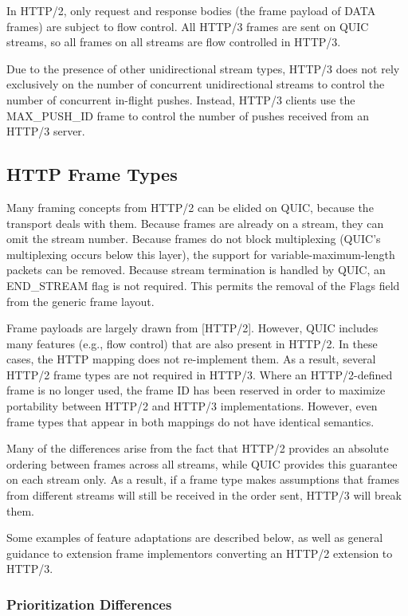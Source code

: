 \documentclass{article}
\begin{document}
In HTTP/2, only request and response bodies (the frame payload of DATA frames) are subject to flow control.  All HTTP/3 frames are sent on QUIC streams, so all frames on all streams are flow controlled in HTTP/3.

Due to the presence of other unidirectional stream types, HTTP/3 does not rely exclusively on the number of concurrent unidirectional streams to control the number of concurrent in-flight pushes. Instead, HTTP/3 clients use the MAX\_PUSH\_ID frame to control the number of pushes received from an HTTP/3 server.

\subsection{HTTP Frame Types}

Many framing concepts from HTTP/2 can be elided on QUIC, because the transport deals with them.  Because frames are already on a stream, they can omit the stream number.  Because frames do not block multiplexing (QUIC's multiplexing occurs below this layer), the support for variable-maximum-length packets can be removed.  Because stream termination is handled by QUIC, an END\_STREAM flag is not required.  This permits the removal of the Flags field from the generic frame layout.

Frame payloads are largely drawn from [HTTP/2].  However, QUIC includes many features (e.g., flow control) that are also present in HTTP/2.  In these cases, the HTTP mapping does not re-implement them. As a result, several HTTP/2 frame types are not required in HTTP/3. Where an HTTP/2-defined frame is no longer used, the frame ID has been reserved in order to maximize portability between HTTP/2 and HTTP/3 implementations.  However, even frame types that appear in both mappings do not have identical semantics.

Many of the differences arise from the fact that HTTP/2 provides an absolute ordering between frames across all streams, while QUIC provides this guarantee on each stream only.  As a result, if a frame type makes assumptions that frames from different streams will still be received in the order sent, HTTP/3 will break them.

Some examples of feature adaptations are described below, as well as general guidance to extension frame implementors converting an HTTP/2 extension to HTTP/3.

\subsubsection{Prioritization Differences}
\end{document}
